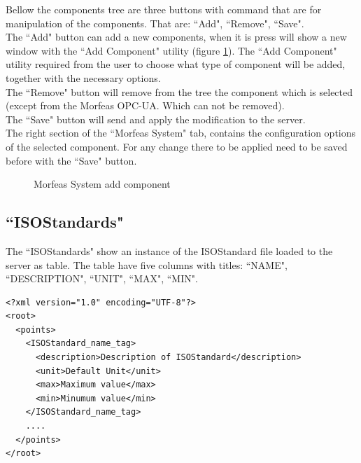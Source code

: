 Bellow the components tree are three buttons with command that are for manipulation of the components.
That are: ``Add", ``Remove", ``Save".\\

\noindent The ``Add" button can add a new components, when it is press will show a new window with the ``Add Component" utility
(figure \ref{fig:Morfeas_sys_conf_add_comp}).
The ``Add Component" utility required from the user to choose what type of component will be added, together with the necessary options.\\

\noindent The ``Remove" button will remove from the tree the component which is selected (except from the Morfeas OPC-UA. Which can not be removed).\\

\noindent The ``Save" button will send and apply the modification to the server.\\

The right section of the ``Morfeas System" tab, contains the configuration options of the selected component.
For any change there to be applied need to be saved before with the ``Save" button.

\begin{figure}[h]
\centering
	\caption{Morfeas System add component}
	\label{fig:Morfeas_sys_conf_add_comp}
\end{figure}

\newpage
\subsection{``ISOStandards"}
The ``ISOStandards" show an instance of the ISOStandard file loaded to the server as table.
The table have five columns with titles: ``NAME", ``DESCRIPTION", ``UNIT", ``MAX", ``MIN".

\begin{lstlisting}[frame=single,caption=Structure of ISOstandard file,label=lst:ISOStandard]
<?xml version="1.0" encoding="UTF-8"?>
<root>
  <points>
    <ISOStandard_name_tag>
      <description>Description of ISOStandard</description>
      <unit>Default Unit</unit>
      <max>Maximum value</max>
      <min>Minumum value</min>
    </ISOStandard_name_tag>
    ....
  </points>
</root>
\end{lstlisting}

